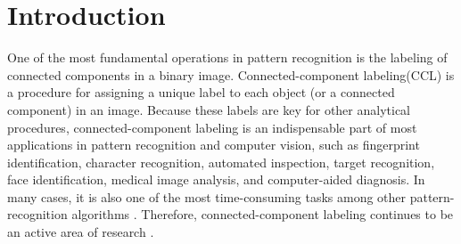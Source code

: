 \section{Introduction}

One of the most fundamental operations in pattern recognition is the labeling of connected components in a binary image.
Connected-component labeling(CCL) is a procedure for assigning a unique label to each object (or a connected component) in 
an image. Because these labels are key for other analytical procedures, connected-component labeling is an 
indispensable part of most applications in pattern recognition and computer vision, such as fingerprint identification,
character recognition, automated inspection, target recognition, face identification, medical image analysis, and 
computer-aided diagnosis. In many cases, it is also one of the most time-consuming tasks among other 
pattern-recognition algorithms \cite{Alnuweiri1992_Parallel}. Therefore, connected-component labeling continues 
to be an active area of research \cite{Gonzales_Digital,Agarwal2006_Efficient,Chang2004_Linear,Hayashi2001_Fast,
Hu2005_Fast,Knop1998_Parallel,Moga1997_Parallel,Wang2003_Parallel}.



